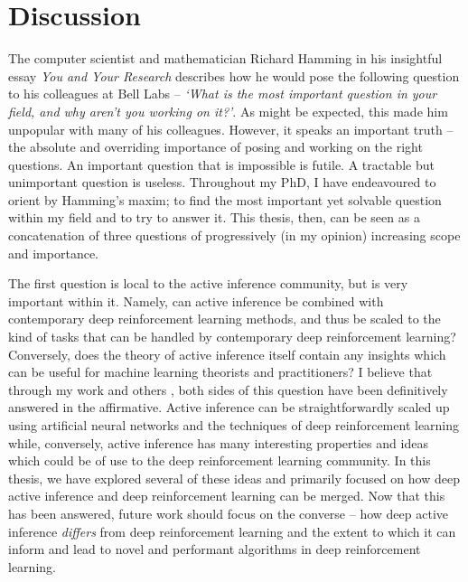 \chapter{Discussion}

The computer scientist and mathematician Richard Hamming in his insightful essay \emph{You and Your Research} describes how he would pose the following question to his colleagues at Bell Labs -- \emph{`What is the most important question in your field, and why aren't you working on it?'}. As might be expected, this made him unpopular with many of his colleagues. However, it speaks an important truth -- the absolute and overriding importance of posing and working on the right questions. An important question that is impossible is futile. A tractable but unimportant question is useless. Throughout my PhD, I have endeavoured to orient by Hamming's maxim; to find the most important yet solvable question within my field and to try to answer it. This thesis, then, can be seen as a concatenation of three questions of progressively (in my opinion) increasing scope and importance.

The first question is local to the active inference community, but is very important within it. Namely, can active inference be combined with contemporary deep reinforcement learning methods, and thus be scaled to the kind of tasks that can be handled by contemporary deep reinforcement learning? Conversely, does the theory of active inference itself contain any insights which can be useful for machine learning theorists and practitioners? I believe that through my work \citep{millidge_deep_2019,millidge2019combining,tschantz2020reinforcement,millidge2020relationship,tschantz2020control} and others \citep{tschantz_scaling_2019,fountas2020deep,ueltzhoffer_deep_2018,ccatal2020learning}, both sides of this question have been definitively answered in the affirmative. Active inference can be straightforwardly scaled up using artificial neural networks and the techniques of deep reinforcement learning while, conversely, active inference has many interesting properties and ideas which could be of use to the deep reinforcement learning community. In this thesis, we have explored several of these ideas and primarily focused on how deep active inference and deep reinforcement learning can be merged. Now that this has been answered, future work should focus on the converse -- how deep active inference \emph{differs} from deep reinforcement learning and the extent to which it can inform and lead to novel and performant algorithms in deep reinforcement learning.  

